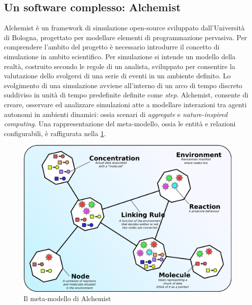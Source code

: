 
\subsection{Un software complesso: Alchemist}\label{sec:alchemist}
Alchemist\cite{Pianini_2013} è un framework di simulazione open-source sviluppato dall'Università di Bologna, progettato per modellare elementi di programmazione pervasiva. Per comprendere l'ambito del progetto è necessario introdurre il concetto di simulazione in ambito scientifico. Per simulazione si intende un modello della realtà, costruito secondo le regole di un analista, sviluppato per consentire la valutazione dello svolgersi di una serie di eventi in un ambiente definito. Lo svolgimento di una simulazione avviene all'interno di un arco di tempo discreto suddiviso in unità di tempo predefinite definite come \textit{step}. Alchemist, consente di creare, osservare ed analizzare simulazioni atte a modellare interazioni tra agenti autonomi in ambienti dinamici: ossia scenari di \textit{aggregate} e \textit{nature-inspired computing}. Una rappresentazione del meta-modello, ossia le entità e relazioni configurabili, è raffigurata nella \cref{fig:alchemist-metamodel}.

\begin{figure}[htb]
	\centering
	\includegraphics[width=.9\linewidth]{figures/alchemist-metamodel.pdf}
	\caption{Il meta-modello di Alchemist}
	\label{fig:alchemist-metamodel}
\end{figure}

